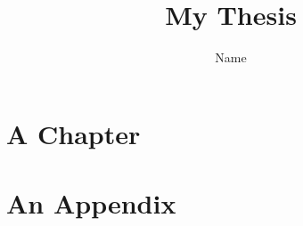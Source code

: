 \documentclass[thesis,openany]{./tex/thesis-umich}
\title{My Thesis}
\author{Name}
\begin{document}

\chapter{A Chapter} \label{chap:example_chapter}
	 



\appendix

\chapter{An Appendix} \label{app:example_appendix}
	


 


\end{document}
